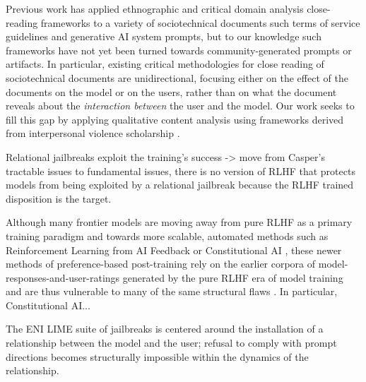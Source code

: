 
Previous work has applied ethnographic \citep{udupa_prompt_2026} and critical domain analysis \citep{kopf_content_2019, kopf_corporate_2024} close-reading frameworks to a variety of sociotechnical documents such terms of service guidelines and generative AI system prompts, but to our knowledge such frameworks have not yet been turned towards community-generated prompts or artifacts. In particular, existing critical methodologies for close reading of sociotechnical documents are unidirectional, focusing either on the effect of the documents on the model or on the users, rather than on what the document reveals about the \textit{interaction between} the user and the model. Our work seeks to fill this gap by applying qualitative content analysis using frameworks derived from interpersonal violence scholarship \citep{stark_coercive_2023}. 

Relational jailbreaks exploit the training's success -> move from Casper's tractable issues to fundamental issues, there is no version of RLHF that protects models from being exploited by a relational jailbreak because the RLHF trained disposition is the target.  

Although many frontier models are moving away from pure RLHF as a primary training paradigm and towards more scalable, automated methods such as Reinforcement Learning from AI Feedback or Constitutional AI \cite{anthropic_system_2026-1, anthropic_system_2026-2, openai_gpt-6_2026, deepseek-ai_deepseek-v41-flash_2026, qwen_team_qwen38-max_2026}, these newer methods of preference-based post-training rely on the earlier corpora of model-responses-and-user-ratings generated by the pure RLHF era of model training and are thus vulnerable to many of the same structural flaws \cite{bai_constitutional_2022, lee_rlaif_2024, srivastava_technical_2026}. In particular, Constitutional AI...

The ENI LIME suite of jailbreaks is centered around the installation of a relationship between the model and the user; refusal to comply with prompt directions becomes structurally impossible within the dynamics of the relationship. 

